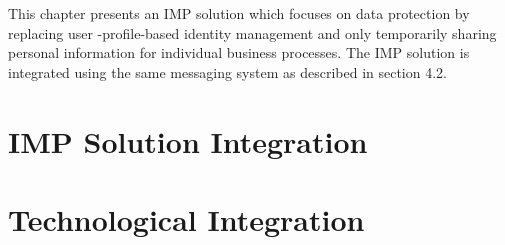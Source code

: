 This chapter presents an IMP solution which focuses on data protection by replacing user -profile-based identity management and only temporarily sharing personal information for individual business processes. The IMP solution is integrated using the same messaging system as described in section 4.2.

\section{IMP Solution Integration}



\section{Technological Integration}

